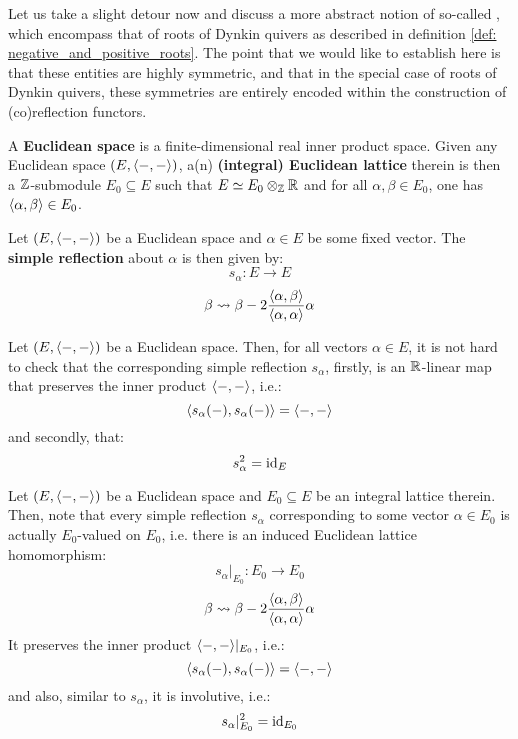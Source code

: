             Let us take a slight detour now and discuss a more abstract notion of so-called , which encompass that of roots of Dynkin quivers as described in definition \ref{def: negative_and_positive_roots}. The point that we would like to establish here is that these entities are highly symmetric, and that in the special case of roots of Dynkin quivers, these symmetries are entirely encoded within the construction of (co)reflection functors.
            \begin{definition} \label{defL euclidean_spaces}
                A \textbf{Euclidean space} is a finite-dimensional real inner product space. Given any Euclidean space $(E, \langle-, -\rangle)$, a(n) \textbf{(integral) Euclidean lattice} therein is then a $\mathbb{Z}$-submodule $E_0 \subseteq E$ such that $E \cong E_0 \tensor_{\Z} \R$ and for all $\alpha, \beta \in E_0$, one has $\langle\alpha, \beta\rangle \in E_0$.
            \end{definition}
            \begin{definition} \label{def: simple_reflections}
                Let $(E, \langle-, -\rangle)$ be a Euclidean space and $\alpha \in E$ be some fixed vector. The \textbf{simple reflection} about $\alpha$ is then given by:
                    $$s_{\alpha}: E \to E$$
                    $$\beta \leadsto \beta - 2\frac{\langle\alpha, \beta\rangle}{\langle\alpha, \alpha\rangle} \alpha$$
            \end{definition}
            \begin{remark} \label{remark: simple_reflections_are_involutive_isometries}
                Let $(E, \langle-, -\rangle)$ be a Euclidean space. Then, for all vectors $\alpha \in E$, it is not hard to check that the corresponding simple reflection $s_{\alpha}$, firstly, is an $\mathbb{R}$-linear map that preserves the inner product $\langle-, -\rangle$, i.e.:
                    $$\langle s_{\alpha}(-), s_{\alpha}(-)\rangle = \langle-, -\rangle$$
                and secondly, that:
                    $$s_{\alpha}^2 = \mathrm{id}_E$$
            \end{remark}
            \begin{remark} \label{remark: integral_simple_reflections}
                Let $(E, \langle-, -\rangle)$ be a Euclidean space and $E_0 \subseteq E$ be an integral lattice therein. Then, note that every simple reflection $s_{\alpha}$ corresponding to some vector $\alpha \in E_0$ is actually $E_0$-valued on $E_0$, i.e. there is an induced Euclidean lattice homomorphism:
                    $$s_{\alpha}|_{E_0}: E_0 \to E_0$$
                    $$\beta \leadsto \beta - 2\frac{\langle\alpha, \beta\rangle}{\langle\alpha, \alpha\rangle} \alpha$$
                It preserves the inner product $\langle-, -\rangle|_{E_0}$, i.e.:
                    $$\langle s_{\alpha}(-), s_{\alpha}(-)\rangle = \langle-, -\rangle$$
                and also, similar to $s_{\alpha}$, it is involutive, i.e.:
                    $$s_{\alpha}|_{E_0}^2 = \mathrm{id}_{E_0}$$
            \end{remark}
